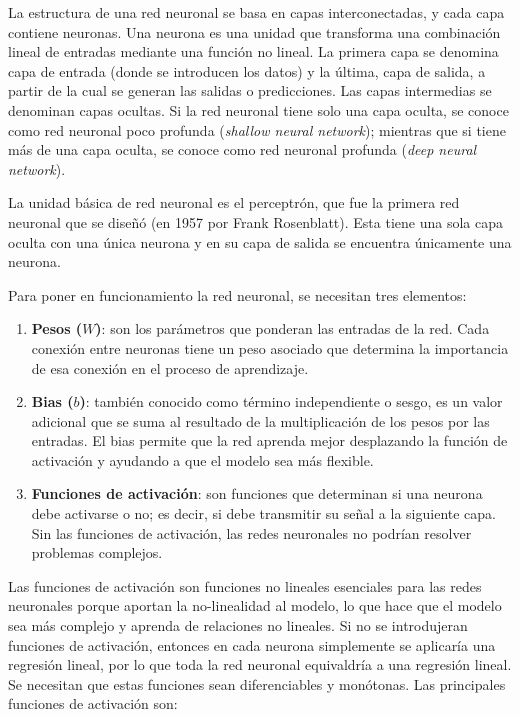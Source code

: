 \documentclass[12pt,twoside]{article}
\begin{document}
La estructura de una red neuronal \cite{redes4} se basa en capas interconectadas, y cada capa contiene neuronas. Una neurona es una unidad que transforma una combinación lineal de entradas mediante una función no lineal. La primera capa se denomina capa de entrada (donde se introducen los datos) y la última, capa de salida, a partir de la cual se generan las salidas o predicciones. Las capas intermedias se denominan capas ocultas. Si la red neuronal tiene solo una capa oculta, se conoce como red neuronal poco profunda (\textit{shallow neural network}); mientras que si tiene más de una capa oculta, se conoce como red neuronal profunda (\textit{deep neural network}).

La unidad básica de red neuronal es el perceptrón, que fue la primera red neuronal que se diseñó (en 1957 por Frank Rosenblatt). Esta tiene una sola capa oculta con una única neurona y en su capa de salida se encuentra únicamente una neurona.

Para poner en funcionamiento la red neuronal, se necesitan tres elementos: 

\begin{enumerate}
    \item \textbf{Pesos ($W$)}: son los parámetros que ponderan las entradas de la red. Cada conexión entre neuronas tiene un peso asociado que determina la importancia de esa conexión en el proceso de aprendizaje.
    \item \textbf{Bias ($b$)}: también conocido como término independiente o sesgo, es un valor adicional que se suma al resultado de la multiplicación de los pesos por las entradas. El bias permite que la red aprenda mejor desplazando la función de activación y ayudando a que el modelo sea más flexible.
    \item \textbf{Funciones de activación}: son funciones que determinan si una neurona debe activarse o no; es decir, si debe transmitir su señal a la siguiente capa. Sin las funciones de activación, las redes neuronales no podrían resolver problemas complejos.
\end{enumerate}

Las funciones de activación \cite{redes5} son funciones no lineales esenciales para las redes neuronales porque aportan la no-linealidad al modelo, lo que hace que el modelo sea más complejo y aprenda de relaciones no lineales. Si no se introdujeran funciones de activación, entonces en cada neurona simplemente se aplicaría una regresión lineal, por lo que toda la red neuronal equivaldría a una regresión lineal. Se necesitan que estas funciones sean diferenciables y monótonas. Las principales funciones de activación son:
\end{document}
